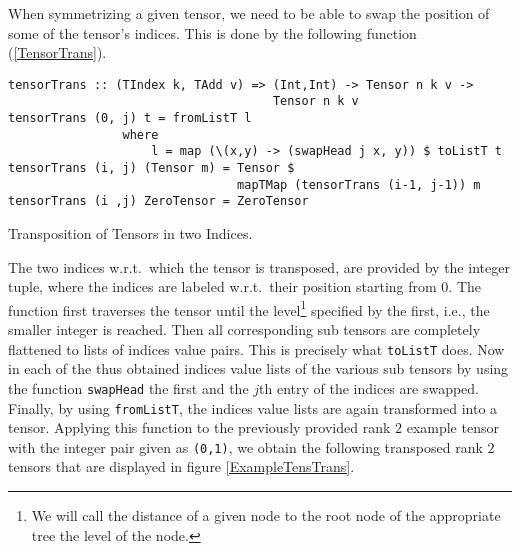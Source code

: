When symmetrizing a given tensor, we need to be able to swap the position of some of the tensor's indices. This is done by the following function (\ref{TensorTrans}).
\begin{listing}[hbt!]
\begin{verbatim}
tensorTrans :: (TIndex k, TAdd v) => (Int,Int) -> Tensor n k v ->
                                     Tensor n k v
tensorTrans (0, j) t = fromListT l
                where
                    l = map (\(x,y) -> (swapHead j x, y)) $ toListT t
tensorTrans (i, j) (Tensor m) = Tensor $
                                mapTMap (tensorTrans (i-1, j-1)) m
tensorTrans (i ,j) ZeroTensor = ZeroTensor
\end{verbatim}
\caption{Transposition of Tensors in two Indices.}\label{TensorTrans}
\end{listing}
The two indices w.r.t.\ which the tensor is transposed, are provided by the integer tuple, where the indices are labeled w.r.t.\ their position starting from $0$. The function first traverses the tensor until the level\footnote{We will call the distance of a given node to the root node of the appropriate tree the level of the node.} specified by the first, i.e., the smaller integer is reached. Then all corresponding sub tensors are completely flattened to lists of indices value pairs. This is precisely what \texttt{toListT} does. Now in each of the thus obtained indices value lists of the various sub tensors by using the function \texttt{swapHead} the first and the $j$th entry of the indices are swapped. Finally, by using  \texttt{fromListT}, the indices value lists are again transformed into a tensor.  Applying this function to the previously provided rank $2$ example tensor with the integer pair given as \texttt{(0,1)}, we obtain the following transposed rank $2$ tensors that are displayed in figure \ref{ExampleTensTrans}.


